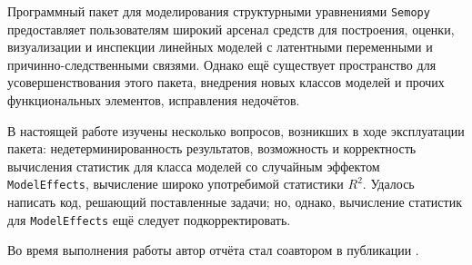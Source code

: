 Программный пакет для моделирования структурными уравнениями \texttt{Semopy} предоставляет пользователям широкий арсенал средств для построения, оценки, визуализации и инспекции линейных моделей с латентными переменными и причинно-следственными связями.
Однако ещё существует пространство для усовершенствования этого пакета, внедрения новых классов моделей и прочих функциональных элементов, исправления недочётов.

В настоящей работе изучены несколько вопросов, возникших в ходе эксплуатации пакета: недетерминированность результатов, возможность и корректность вычисления статистик для класса моделей со случайным эффектом \texttt{ModelEffects}, вычисление широко употребимой статистики $ R^2 $.
Удалось написать код, решающий поставленные задачи; но, однако, вычисление статистик для \texttt{ModelEffects} ещё следует подкорректировать.

Во время выполнения работы автор отчёта стал соавтором в публикации \cite{lanczos}.
